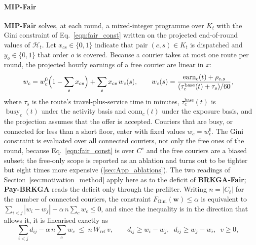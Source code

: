 \documentclass[a4paper,11pt,review,3p,authoryear]{elsarticle}
\newcommand{\Hist}{\mathcal{H}}
\newcommand{\FG}{F_{\text{Gini}}}
\newcommand{\conn}{\mathrm{conn}}
\DeclareMathOperator{\earn}{earn}
\DeclareMathOperator{\busy}{busy}
\begin{document}
\paragraph{MIP-Fair}
\label{sec:mipfair}
\textbf{MIP-Fair} solves, at each round, a mixed-integer programme over $K_t$ with the Gini constraint of Eq.~\eqref{eqn:fair_const} written on the projected end-of-round values of $\Hist_t$. Let $x_{cs} \in \{0,1\}$ indicate that pair $(c,s) \in K_t$ is dispatched and $y_o \in \{0,1\}$ that order $o$ is covered. Because a courier takes at most one route per round, the projected hourly earnings of a free courier are linear in $x$:
\begin{equation}
w_c = w_c^0 \Bigl(1 - \sum_{s} x_{cs}\Bigr) + \sum_{s} x_{cs}\, w_c(s), \qquad
w_c(s) = \frac{\earn_c(t) + \rho_{c,s}}{(\tau^{\text{base}}_c(t) + \tau_s)/60},
\label{eqn:mipfair_w}
\end{equation}
where $\tau_s$ is the route's travel-plus-service time in minutes, $\tau^{\text{base}}_c(t)$ is $\busy_c(t)$ under the activity basis and $\conn_c(t)$ under the exposure basis, and the projection assumes that the offer is accepted. Couriers that are busy, or connected for less than a short floor, enter with fixed values $w_c = w_c^0$. The Gini constraint is evaluated over all connected couriers, not only the free ones of the round, because Eq.~\eqref{eqn:fair_const} is over $C^{e}$ and the free couriers are a biased subset; the free-only scope is reported as an ablation and turns out to be tighter but eight times more expensive (\ref{sec:App_ablations}). The two readings of Section~\ref{sec:motivation_method} apply here as to the deficit of \textbf{BRKGA-Fair}; \textbf{Pay-BRKGA} reads the deficit only through the prefilter. Writing $n = |C_t|$ for the number of connected couriers, the constraint $\FG(\mathbf{w}) \le \alpha$ is equivalent to $\sum_{i<j} |w_i - w_j| - \alpha\, n \sum_c w_c \le 0$, and since the inequality is in the direction that allows it, it is linearised exactly as
\begin{equation}
\sum_{i<j} d_{ij} - \alpha\, n \sum_c w_c \;\le\; n\, W_{\text{ref}}\, v, \qquad
d_{ij} \ge w_i - w_j,\;\; d_{ij} \ge w_j - w_i,\;\; v \ge 0,
\label{eqn:mipfair_gini}
\end{equation}
\end{document}
